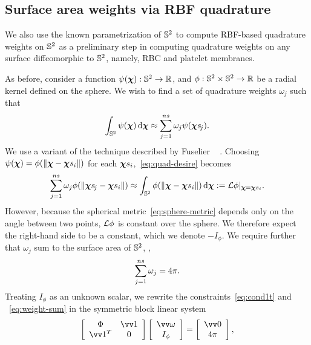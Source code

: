 \subsection{Surface area weights via RBF quadrature}\label{sec:rbf-quadrature}

We also use the known parametrization of $\mathbb{S}^2$ to compute RBF-based quadrature weights
on $\mathbb{S}^2$ as a preliminary step in computing quadrature weights on any surface
diffeomorphic to $\mathbb{S}^2$, namely, RBC and platelet membranes.

As before, consider a function $\psi(\boldsymbol{\chi}):\mathbb{S}^2 \to \mathbb{R}$, and $\phi: \mathbb{S}^2 \times \mathbb{S}^2 \to \mathbb{R}$ be a radial kernel defined on the sphere. We wish to find a set
of quadrature weights $\omega_j$ such that
\begin{equation}\label{eq:quad-desire}
    \int_{\sphere} \psi(\Xp) \d\Xp \approx \sum_{j=1}^{\sample\cardinality} \omega_j \psi(\Xpsj).
\end{equation}
We use a variant of the technique described by Fuselier ~%
\cite{Fuselier:2013coba}.  Choosing $\psi(\Xp) = \phi(\|\Xp-\sample\Xp_i\|)$ for each
$\sample\Xp_i$,~\eqref{eq:quad-desire} becomes
\begin{equation}
    \sum_{j=1}^{\sample\cardinality} \omega_j \phi(\|\Xpsj-\sample\Xp_i\|)
    \approx \int_{\sphere}\phi(\|\Xp-\sample\Xp_i\|) \d\Xp := \L\phi|_{\Xp=\sample\Xp_i}.
    \label{eq:cond1t}
\end{equation}
However, because the spherical metric~\eqref{eq:sphere-metric} depends only on the angle
between two points, $\mathcal{L}\phi$ is constant over
the sphere. We therefore expect the right-hand side to be a constant, which we denote
$-I_\phi$. We require further that $\omega_j$ sum to the surface area of $\mathbb{S}^2$,
,
\begin{equation}
    \sum_{j=1}^{\sample\cardinality} \omega_j  = 4\pi.
    \label{eq:weight-sum}
\end{equation}
Treating $I_\phi$ as an unknown scalar, we rewrite the constraints~\eqref{eq:cond1t} and%
~\eqref{eq:weight-sum} in the symmetric block linear system %
\begin{equation}\label{eq:rbf-quadrature}
    \left[\begin{array}{cc}
            \Phi & \arr{1} \\ \arr{1}^T & 0
    \end{array}\right]\left[\begin{array}{cc}
            \arr{\omega} \\ I_\phi
    \end{array}\right] = \left[\begin{array}{c}
            \arr{0} \\ 4\pi
    \end{array}\right],
\end{equation}
